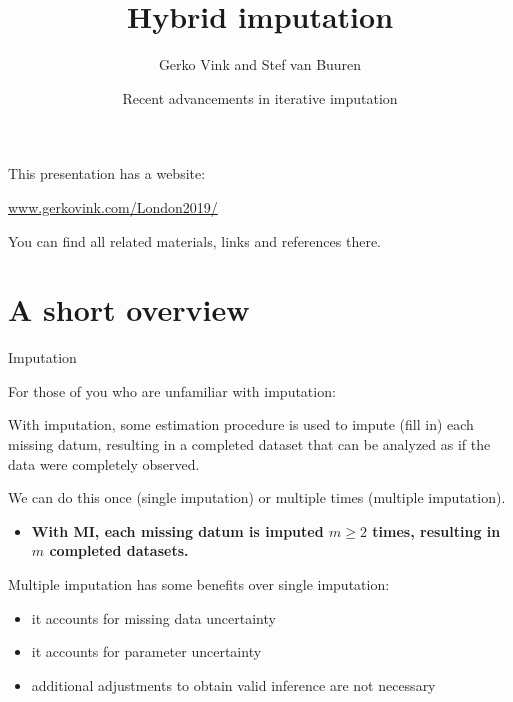 \documentclass[ignorenonframetext,]{beamer}
\title{Hybrid imputation}
\author{Gerko Vink and Stef van Buuren}
\date{Recent advancements in iterative imputation}
\providecommand{\tightlist}{%
  \setlength{\itemsep}{0pt}\setlength{\parskip}{0pt}}
\begin{document}
\frame{\titlepage}

\begin{frame}

\end{frame}

\begin{frame}{This presentation \textbar{} has a website:}
\protect\hypertarget{this-presentation-has-a-website}{}

\href{https://www.gerkovink.com/London2019/}{www.gerkovink.com/London2019/}

 You can find all related materials, links and references there.

\end{frame}

\hypertarget{a-short-overview}{%
\section{A short overview}\label{a-short-overview}}

\begin{frame}{Imputation}
\protect\hypertarget{imputation}{}

For those of you who are unfamiliar with imputation:

 With imputation, some estimation procedure is used to impute (fill in)
each missing datum, resulting in a completed dataset that can be
analyzed as if the data were completely observed.

We can do this once (single imputation) or multiple times (multiple
imputation).

\begin{itemize}
\tightlist
\item
  \textbf{With MI, each missing datum is imputed \(m \geq 2\) times,
  resulting in \(m\) completed datasets.}
\end{itemize}

Multiple imputation has some benefits over single imputation:

\begin{itemize}
\tightlist
\item
  it accounts for missing data uncertainty
\item
  it accounts for parameter uncertainty
\item
  additional adjustments to obtain valid inference are not necessary
\end{itemize}

\end{frame}
\end{document}
